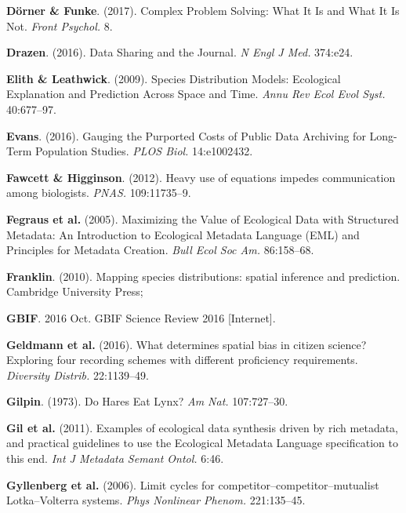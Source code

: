 \documentclass[12pt]{article}
\begin{document}
\leavevmode\hypertarget{ref-DornFunk17}{}%
\textbf{Dörner \& Funke}. (2017). Complex Problem Solving: What It Is
and What It Is Not. \emph{Front Psychol.} 8.

\leavevmode\hypertarget{ref-Draz16}{}%
\textbf{Drazen}. (2016). Data Sharing and the Journal. \emph{N Engl J
Med.} 374:e24.

\leavevmode\hypertarget{ref-ElitLeat09}{}%
\textbf{Elith \& Leathwick}. (2009). Species Distribution Models:
Ecological Explanation and Prediction Across Space and Time. \emph{Annu
Rev Ecol Evol Syst.} 40:677--97.

\leavevmode\hypertarget{ref-Evan16}{}%
\textbf{Evans}. (2016). Gauging the Purported Costs of Public Data
Archiving for Long-Term Population Studies. \emph{PLOS Biol.}
14:e1002432.

\leavevmode\hypertarget{ref-FawcHigg12}{}%
\textbf{Fawcett \& Higginson}. (2012). Heavy use of equations impedes
communication among biologists. \emph{PNAS.} 109:11735--9.

\leavevmode\hypertarget{ref-FegrAnde05}{}%
\textbf{Fegraus et al.} (2005). Maximizing the Value of Ecological Data
with Structured Metadata: An Introduction to Ecological Metadata
Language (EML) and Principles for Metadata Creation. \emph{Bull Ecol Soc
Am.} 86:158--68.

\leavevmode\hypertarget{ref-Fran10a}{}%
\textbf{Franklin}. (2010). Mapping species distributions: spatial
inference and prediction. Cambridge University Press;

\leavevmode\hypertarget{ref-GBIF16}{}%
\textbf{GBIF}. 2016 Oct. GBIF Science Review 2016 {[}Internet{]}.

\leavevmode\hypertarget{ref-GeldHeil16}{}%
\textbf{Geldmann et al.} (2016). What determines spatial bias in citizen
science? Exploring four recording schemes with different proficiency
requirements. \emph{Diversity Distrib.} 22:1139--49.

\leavevmode\hypertarget{ref-Gilp73}{}%
\textbf{Gilpin}. (1973). Do Hares Eat Lynx? \emph{Am Nat.} 107:727--30.

\leavevmode\hypertarget{ref-GilVand11}{}%
\textbf{Gil et al.} (2011). Examples of ecological data synthesis driven
by rich metadata, and practical guidelines to use the Ecological
Metadata Language specification to this end. \emph{Int J Metadata Semant
Ontol.} 6:46.

\leavevmode\hypertarget{ref-GyllYan06}{}%
\textbf{Gyllenberg et al.} (2006). Limit cycles for
competitor--competitor--mutualist Lotka--Volterra systems. \emph{Phys
Nonlinear Phenom.} 221:135--45.
\end{document}

